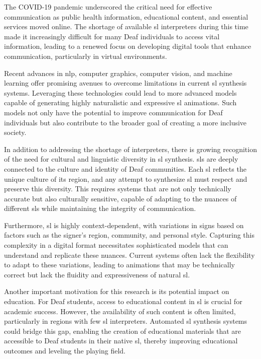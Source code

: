 \documentclass[../../main.tex]{subfiles}
\begin{document}
The COVID-19 pandemic underscored the critical need for effective communication as public health information, educational content, and essential services moved online. The shortage of available \gls{sl} interpreters during this time made it increasingly difficult for many Deaf individuals to access vital information, leading to a renewed focus on developing digital tools that enhance communication, particularly in virtual environments.

Recent advances in \gls{nlp}, computer graphics, computer vision, and machine learning offer promising avenues to overcome limitations in current \gls{sl} synthesis systems. Leveraging these technologies could lead to more advanced models capable of generating highly naturalistic and expressive \gls{sl} animations. Such models not only have the potential to improve communication for Deaf individuals but also contribute to the broader goal of creating a more inclusive society.

In addition to addressing the shortage of interpreters, there is growing recognition of the need for cultural and linguistic diversity in \gls{sl} synthesis. \gls{sl}s are deeply connected to the culture and identity of Deaf communities. Each \gls{sl} reflects the unique culture of its region, and any attempt to synthesize \gls{sl} must respect and preserve this diversity. This requires systems that are not only technically accurate but also culturally sensitive, capable of adapting to the nuances of different \gls{sl}s while maintaining the integrity of communication.

Furthermore, \gls{sl} is highly context-dependent, with variations in signs based on factors such as the signer’s region, community, and personal style. Capturing this complexity in a digital format necessitates sophisticated models that can understand and replicate these nuances. Current systems often lack the flexibility to adapt to these variations, leading to animations that may be technically correct but lack the fluidity and expressiveness of natural \gls{sl}.

Another important motivation for this research is its potential impact on education. For Deaf students, access to educational content in \gls{sl} is crucial for academic success. However, the availability of such content is often limited, particularly in regions with few \gls{sl} interpreters. Automated \gls{sl} synthesis systems could bridge this gap, enabling the creation of educational materials that are accessible to Deaf students in their native \gls{sl}, thereby improving educational outcomes and leveling the playing field.
\end{document}

